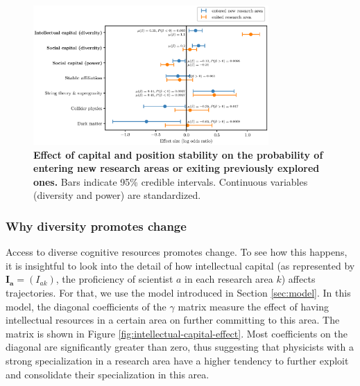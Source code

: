 \documentclass{article}
\begin{document}

\begin{figure}[h]
    \centering
    \includegraphics[width=0.8\textwidth]{plots/exited_score_effects_entropy_magnitude.eps}
    \caption{\textbf{Effect of capital and position stability on the probability of entering new research areas or exiting previously explored ones.} Bars indicate 95\% credible intervals. Continuous variables (diversity and power) are standardized.}
    \label{fig:diversification_score_effect}
\end{figure}


\subsubsection{Why diversity promotes change}

Access to diverse cognitive resources promotes change. To see how this happens, it is insightful to look into the detail of how intellectual capital (as represented by $\bm{I_a}=(I_{ak})$, the proficiency of scientist $a$ in each research area $k$) affects trajectories. For that, we use the model introduced in Section \ref{sec:model}. In this model, the diagonal coefficients of the $\gamma$ matrix measure the effect of having intellectual resources in a certain area on further committing to this area. The matrix is shown in Figure \ref{fig:intellectual-capital-effect}. Most coefficients on the diagonal are significantly greater than zero, thus suggesting that physicists with a strong specialization in a research area have a higher tendency to further exploit and consolidate their specialization in this area.
\end{document}
